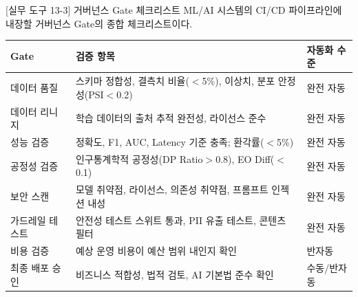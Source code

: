 \begin{practicaltool}{[실무 도구 13-3] 거버넌스 Gate 체크리스트}
ML/AI 시스템의 CI/CD 파이프라인에 내장할 거버넌스 Gate의 종합 체크리스트이다.

\begin{tabularx}{\textwidth}{|p{3cm}|X|p{2cm}|}
\hline
\textbf{Gate} & \textbf{검증 항목} & \textbf{자동화 수준} \\
\hline
데이터 품질 & 스키마 정합성, 결측치 비율($<$5\%), 이상치, 분포 안정성(PSI$<$0.2) & 완전 자동 \\
\hline
데이터 리니지 & 학습 데이터의 출처 추적 완전성, 라이선스 준수 & 완전 자동 \\
\hline
성능 검증 & 정확도, F1, AUC, Latency 기준 충족; 환각률($<$5\%) & 완전 자동 \\
\hline
공정성 검증 & 인구통계학적 공정성(DP Ratio$>$0.8), EO Diff($<$0.1) & 완전 자동 \\
\hline
보안 스캔 & 모델 취약점, 라이선스, 의존성 취약점, 프롬프트 인젝션 내성 & 완전 자동 \\
\hline
가드레일 테스트 & 안전성 테스트 스위트 통과, PII 유출 테스트, 콘텐츠 필터 & 완전 자동 \\
\hline
비용 검증 & 예상 운영 비용이 예산 범위 내인지 확인 & 반자동 \\
\hline
최종 배포 승인 & 비즈니스 적합성, 법적 검토, AI 기본법 준수 확인 & 수동/반자동 \\
\hline
\end{tabularx}
\end{practicaltool}
